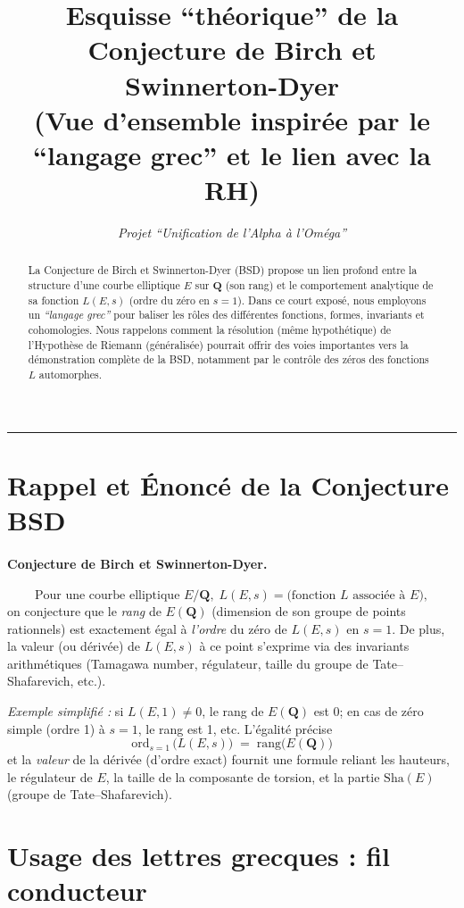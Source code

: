 \documentclass[11pt]{article}
\title{\textbf{Esquisse “théorique” de la Conjecture de Birch et Swinnerton-Dyer}\\
\large{(Vue d'ensemble inspirée par le “langage grec” et le lien avec la RH)}}
\author{\textit{Projet “Unification de l’Alpha à l’Oméga”}}
\date{}
\newcommand{\Sh}{\mathrm{Sha}}
\begin{document}
\maketitle

\begin{abstract}
La Conjecture de Birch et Swinnerton-Dyer (BSD) propose un lien profond entre la structure d'une courbe elliptique $E$ sur $\mathbf{Q}$ (son rang) et le comportement analytique de sa fonction $L(E,s)$ (ordre du zéro en $s=1$). Dans ce court exposé, nous employons un \emph{“langage grec”} pour baliser les rôles des différentes fonctions, formes, invariants et cohomologies. Nous rappelons comment la résolution (même hypothétique) de l'Hypothèse de Riemann (généralisée) pourrait offrir des voies importantes vers la démonstration complète de la BSD, notamment par le contrôle des zéros des fonctions $L$ automorphes.
\end{abstract}

\hrule
\vspace{6pt}

\section{Rappel et Énoncé de la Conjecture BSD}

\paragraph{Conjecture de Birch et Swinnerton-Dyer.}
\[
  \text{Pour une courbe elliptique } E/\mathbf{Q}, \;
  L(E,s) = \text{(fonction $L$ associée à $E$)}, 
\]
on conjecture que le \emph{rang} de $E(\mathbf{Q})$ (dimension de son groupe de points rationnels) est exactement égal à \emph{l'ordre} du zéro de $L(E,s)$ en $s=1$. De plus, la valeur (ou dérivée) de $L(E,s)$ à ce point s'exprime via des invariants arithmétiques (Tamagawa number, régulateur, taille du groupe de Tate--Shafarevich, etc.).

\medskip
\noindent
\emph{Exemple simplifié :} si $L(E,1)\neq 0$, le rang de $E(\mathbf{Q})$ est 0; en cas de zéro simple (ordre 1) à $s=1$, le rang est 1, etc. L'égalité précise
\[
   \mathrm{ord}_{s=1}\,\bigl(L(E,s)\bigr) \;=\; \mathrm{rang}\bigl(E(\mathbf{Q})\bigr)
\]
et la \emph{valeur} de la dérivée (d'ordre exact) fournit une formule reliant les hauteurs, le régulateur de $E$, la taille de la composante de torsion, et la partie $\Sh(E)$ (groupe de Tate--Shafarevich).

\section{Usage des lettres grecques : fil conducteur}
\end{document}
